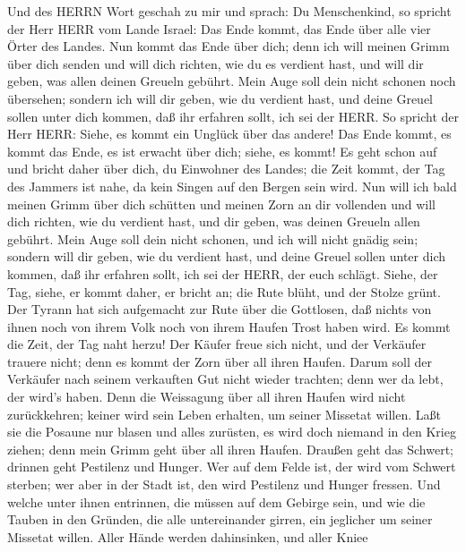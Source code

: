  Und des HERRN Wort geschah zu mir und sprach: 
Du Menschenkind, so spricht der Herr HERR vom Lande Israel: Das Ende
kommt, das Ende über alle vier Örter des Landes.  Nun kommt
das Ende über dich; denn ich will meinen Grimm über dich senden und will
dich richten, wie du es verdient hast, und will dir geben, was allen
deinen Greueln gebührt.  Mein Auge soll dein nicht schonen
noch übersehen; sondern ich will dir geben, wie du verdient hast, und
deine Greuel sollen unter dich kommen, daß ihr erfahren sollt, ich sei
der HERR.  So spricht der Herr HERR: Siehe, es kommt ein
Unglück über das andere!  Das Ende kommt, es kommt das Ende,
es ist erwacht über dich; siehe, es kommt!  Es geht schon
auf und bricht daher über dich, du Einwohner des Landes; die Zeit kommt,
der Tag des Jammers ist nahe, da kein Singen auf den Bergen sein wird.
 Nun will ich bald meinen Grimm über dich schütten und
meinen Zorn an dir vollenden und will dich richten, wie du verdient
hast, und dir geben, was deinen Greueln allen gebührt.  Mein
Auge soll dein nicht schonen, und ich will nicht gnädig sein; sondern
will dir geben, wie du verdient hast, und deine Greuel sollen unter dich
kommen, daß ihr erfahren sollt, ich sei der HERR, der euch schlägt.
 Siehe, der Tag, siehe, er kommt daher, er bricht an; die
Rute blüht, und der Stolze grünt.  Der Tyrann hat sich
aufgemacht zur Rute über die Gottlosen, daß nichts von ihnen noch von
ihrem Volk noch von ihrem Haufen Trost haben wird.  Es
kommt die Zeit, der Tag naht herzu! Der Käufer freue sich nicht, und der
Verkäufer trauere nicht; denn es kommt der Zorn über all ihren Haufen.
 Darum soll der Verkäufer nach seinem verkauften Gut nicht
wieder trachten; denn wer da lebt, der wird's haben. Denn die Weissagung
über all ihren Haufen wird nicht zurückkehren; keiner wird sein Leben
erhalten, um seiner Missetat willen.  Laßt sie die Posaune
nur blasen und alles zurüsten, es wird doch niemand in den Krieg ziehen;
denn mein Grimm geht über all ihren Haufen.  Draußen geht
das Schwert; drinnen geht Pestilenz und Hunger. Wer auf dem Felde ist,
der wird vom Schwert sterben; wer aber in der Stadt ist, den wird
Pestilenz und Hunger fressen.  Und welche unter ihnen
entrinnen, die müssen auf dem Gebirge sein, und wie die Tauben in den
Gründen, die alle untereinander girren, ein jeglicher um seiner Missetat
willen.  Aller Hände werden dahinsinken, und aller Kniee
